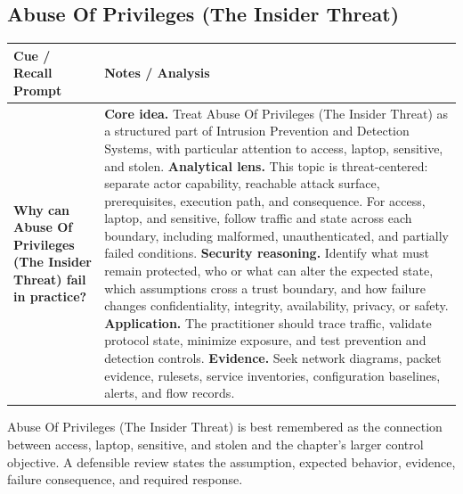 \documentclass[11pt]{article}
\newcommand{\CornellHeader}{%
\rowcolor{Navy}\color{white}\bfseries Cue / Recall Prompt & \color{white}\bfseries Notes / Analysis\\\hline}
\newcommand{\CornellRow}[2]{%
\cellcolor{CueGray}\RaggedRight\textbf{#1} & \RaggedRight #2\\\hline}
\begin{document}
\subsection*{Abuse Of Privileges (The Insider Threat)}
\begin{longtable}{>{\RaggedRight\arraybackslash}p{}|>{\RaggedRight\arraybackslash}p{}}
\CornellHeader
\CornellRow{Why can Abuse Of Privileges (The Insider Threat) fail in practice?}{\textbf{Core idea.} Treat Abuse Of Privileges (The Insider Threat) as a structured part of Intrusion Prevention and Detection Systems, with particular attention to access, laptop, sensitive, and stolen. \textbf{Analytical lens.} This topic is threat-centered: separate actor capability, reachable attack surface, prerequisites, execution path, and consequence. For access, laptop, and sensitive, follow traffic and state across each boundary, including malformed, unauthenticated, and partially failed conditions. \textbf{Security reasoning.} Identify what must remain protected, who or what can alter the expected state, which assumptions cross a trust boundary, and how failure changes confidentiality, integrity, availability, privacy, or safety. \textbf{Application.} The practitioner should trace traffic, validate protocol state, minimize exposure, and test prevention and detection controls. \textbf{Evidence.} Seek network diagrams, packet evidence, rulesets, service inventories, configuration baselines, alerts, and flow records.}
\end{longtable}
\begin{topicsummary}
Abuse Of Privileges (The Insider Threat) is best remembered as the connection between access, laptop, sensitive, and stolen and the chapter's larger control objective. A defensible review states the assumption, expected behavior, evidence, failure consequence, and required response.
\end{topicsummary}
\end{document}
